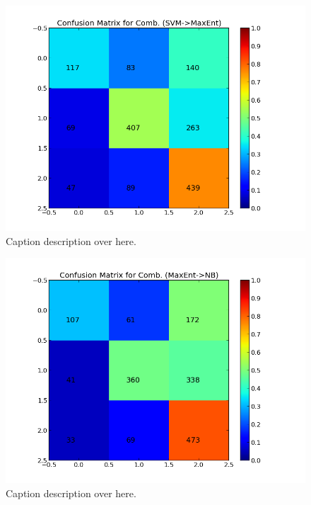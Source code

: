 \begin{minipage}[s]{\linewidth}
     \begin{minipage}{0.45\linewidth}
          \begin{figure}[H]
               \includegraphics[width=\linewidth]{../img/plots/grid/confusion_matrix_Comb-SVM-MaxEnt.png}
           \caption[Results overview across models]{Caption description over here.}
           \label{fig:confmat_svm_maxent}
          \end{figure}
     \end{minipage}
     \hspace{0.05\linewidth}
     \begin{minipage}{0.45\linewidth}
          \begin{figure}[H]
               \includegraphics[width=\linewidth]{../img/plots/grid/confusion_matrix_Comb-MaxEnt-NB.png}
           \caption[Results overview across models]{Caption description over here.}
           \label{fig:confmat_maxent_nb}
          \end{figure}
     \end{minipage}   \\
         


\end{minipage}
